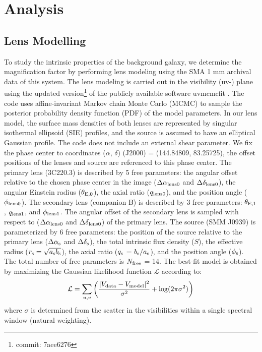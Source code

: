 \documentclass{emulateapj}
\begin{document}
\section{Analysis}
\subsection{Lens Modelling} \label{sec:Lens} 
To study the intrinsic properties of the background galaxy, we determine the magnification factor by performing
lens modeling using the SMA 1 mm archival data of this system. The lens modeling is carried out in the visibility
(uv-) plane using the updated version\footnote{commit: 7aee6276} of the publicly available software {\sc uvmcmcfit}
\citep{Bussmann15a}. The code uses affine-invariant Markov chain Monte Carlo (MCMC) to sample the posterior
probability density function (PDF) of the model parameters. In our lens model, the surface mass densities of both
lenses are represented by singular isothermal ellipsoid (SIE) profiles, and the source is assumed to have an
elliptical Gaussian profile. The code does not include an external shear parameter. \newline
We fix the phase center to coordinates ($\alpha$, $\delta$) (J2000) = (144.84809\degr, 83.25725\degr), the
offset positions of the lenses and source are referenced to this phase center. The primary lens (3C220.3) is
described by 5 free parameters: the angular offset relative to
the chosen phase center in the image ($\Delta \alpha_{\rm
lens0}$ and $\Delta \delta_{\rm lens0}$), the angular Einstein radius ($\theta_{\rm E,0}$), the
axial ratio ($q_{\rm lens0}$), and the position angle ($\phi_{\rm lens0}$). The secondary lens (companion B) is
described by 3 free parameters: $\theta_{\rm E,1}$, $q_{\rm lens1}$, and $\phi_{\rm lens1}$. The angular offset
of the secondary
lens is sampled with respect to ($\Delta \alpha_{\rm lens0}$ and $\Delta \delta_{\rm lens0}$) of
the primary lens.
The source (SMM J0939) is parameterized by
6 free parameters: the position of the source relative to the
primary lens ($\Delta \alpha_{\rm s}$ and $\Delta
\delta_{\rm s}$), the total intrinsic flux density ($S$), the
effective radius ($r_{\rm s} = \sqrt{a_{\rm s} b_{\rm s}}$), the axial
ratio ($q_{\rm s}$ =  $b_{\rm s}/a_{\rm s}$), and the position angle
($\phi_{\rm s}$).
The total number of free parameters is $N_{\rm free}$ = 14. The best-fit model is obtained by maximizing the
Gaussian likelihood function $ \mathcal{L} $ according to:
\begin{equation}
    \mathcal{L} = \sum_{u, v}\left( \frac{|V_{\rm data} - V_{\rm
    model}|^2}{\sigma^2} + {\rm log}(2 \pi \sigma^2) \right)
\end{equation}
\noindent where $\sigma$ is determined from the scatter in the visibilities within a
single spectral window (natural weighting).
\end{document}
